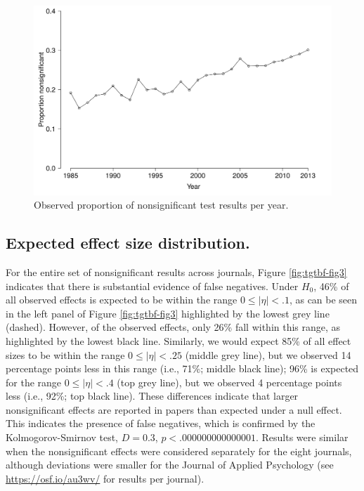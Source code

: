 \documentclass[a5paper]{book}
\begin{document}
\begin{figure}[h]

{\centering \includegraphics[width=1\linewidth]{assets/figures/tgtbf-fig2.pdf.svg} 

}

\caption{Observed proportion of nonsignificant test results per year.}\label{fig:tgtbf-fig2}
\end{figure}

\subsection{Expected effect size
distribution.}\label{expected-effect-size-distribution.}

For the entire set of nonsignificant results across journals, Figure
\ref{fig:tgtbf-fig3} indicates that there is substantial evidence of
false negatives. Under \(H_0\), 46\% of all observed effects is expected
to be within the range \(0\leq|\eta|<.1\), as can be seen in the left
panel of Figure \ref{fig:tgtbf-fig3} highlighted by the lowest grey line
(dashed). However, of the observed effects, only 26\% fall within this
range, as highlighted by the lowest black line. Similarly, we would
expect 85\% of all effect sizes to be within the range
\(0\leq|\eta|<.25\) (middle grey line), but we observed 14 percentage
points less in this range (i.e., 71\%; middle black line); 96\% is
expected for the range \(0\leq|\eta|<.4\) (top grey line), but we
observed 4 percentage points less (i.e., 92\%; top black line). These
differences indicate that larger nonsignificant effects are reported in
papers than expected under a null effect. This indicates the presence of
false negatives, which is confirmed by the Kolmogorov-Smirnov test,
\(D=0.3\), \(p<.000000000000001\). Results were similar when the
nonsignificant effects were considered separately for the eight
journals, although deviations were smaller for the Journal of Applied
Psychology (see \url{https://osf.io/au3wv/} for results per journal).
\end{document}
